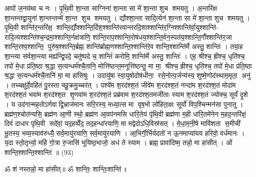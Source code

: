आपो॑ ज॒नय॑था च नः । पृ॒थि॒वी शा॒न्ता साग्निना॑ शा॒न्ता सा मे॑ शा॒न्ता शुच शमयतु । अ॒न्तरि॑क्ष शा॒न्तन्तद्वा॒युना॑ शा॒न्तन्तन्मे॑ शा॒न्त शुच शमयतु । द्यौश्शा॒न्ता सादि॒त्येन॑ शा॒न्ता सा मे॑ शा॒न्ता शुच शमयतु । पृ॒थि॒वी शान्ति॑र॒न्तरि॑क्ष॒ शान्ति॒र्द्यौश्शान्ति॒र्दिश॒श्शान्ति॑रवान्तरदि॒शाश्शान्ति॑र॒ग्निश्शान्ति॑र्वा॒युश्शान्ति॑- रादि॒त्यश्शान्ति॑श्च॒न्द्रमा॒श्शान्ति॒र्नक्ष॑त्राणि॒ शान्ति॒राप॒श्शान्ति॒रोष॑धय॒श्शान्ति॒र्वन॒स्पत॑य॒श्शान्ति॒र्गौश्शान्ति॑र॒जा शान्ति॒रश्व॒श्शान्ति॒ पुरु॑ष॒श्शान्ति॒र्ब्रह्म॒ शान्ति॑र्ब्राह्म॒णश्शान्ति॒श्शान्ति॑रे॒व शान्ति॒श्शान्ति॑र्मे अस्तु॒ शान्तिः॑ । तया॒ह शा॒न्त्या स॑र्वशा॒न्त्या मह्य॑न्द्वि॒पदे॒ चतु॑ष्पदे च॒ शान्तिं॑ करोमि॒ शान्ति॑र्मे अस्तु॒ शान्तिः॑ । एह॒ श्रीश्च॒ ह्रीश्च॒ धृति॑श्च॒ तपो॑ मे॒धा प्र॑ति॒ष्ठा श्र॒द्धा स॒त्यन्धर्म॑श्चै॒तानि॒ मोत्ति॑ष्ठन्त॒मनूत्ति॑ष्ठन्तु॒ मा मा॒ श्रीश्च॒ ह्रीश्च॒ धृति॑श्च॒ तपो॑ मे॒धा प्र॑ति॒ष्ठा श्र॒द्धा स॒त्यन्धर्म॑श्चै॒तानि॑ मा॒ मा हा॑सिषुः । उदायु॑षा स्वा॒युषोदोष॑धीना॒ रसे॒नोत्प॒र्जन्य॑स्य॒ शुष्मे॒णोद॑स्थाम॒मृता॒ अनु॑ । तच्चक्षु॑र्दे॒वहि॑तं पु॒रस्ताच्छु॒क्रमु॒च्चर॑त् । पश्ये॑म श॒रद॑श्श॒तं जीवे॑म श॒रद॑श्श॒तं नन्दा॑म श॒रद॑श्श॒तं मोदा॑म श॒रद॑श्श॒तं भवा॑म श॒रद॑श्श॒त शृ॒णवा॑म श॒रद॑श्श॒तं प्रब्र॑वाम श॒रद॑श्श॒तमजी॑ताः स्याम श॒रद॑श्श॒तं ज्योक्च॒ सूर्यं॑ दृ॒शे । य उद॑गान्मह॒तोऽर्णवाद्वि॒भ्राज॑मानः सरि॒रस्य॒ मध्या॒त्स मा वृष॒भो लो॑हिता॒क्षः सूर्यो॑ विप॒श्चिन्मन॑सा पुनातु । ब्रह्म॑ण॒श्चोत॑न्यसि॒ ब्रह्म॑ण आ॒णी स्थो॒ ब्रह्म॑ण आ॒वप॑नमसि धारि॒तेयं पृ॑थि॒वी ब्रह्म॑णा म॒ही धा॑रि॒तमे॑नेन म॒हद॒न्तरि॑क्षं॒ दिवं॑ दाधार पृथि॒वी सदे॑वां॒ यद॒हव्वेँद॒ तद॒हन्धा॑रयाणि॒ मा मद्वेदोऽधि॒विस्र॑सत् । मे॒धा॒म॒नी॒षे मावि॑शता स॒मीची॑ भू॒तस्य॒ भव्य॒स्याव॑रुध्यै॒ सर्व॒मायु॑रयाणि॒ सर्व॒मायु॑रयाणि । आ॒भिर्गी॒र्भिर्यदतो॑ न ऊ॒नमाप्या॑यय हरिवो॒ वर्ध॑मानः । य॒दा स्तो॒तृभ्यो॒ महि॑ गो॒त्रा रु॒जासि॑ भूयिष्ठ॒भाजो॒ अध॑ ते स्याम । ब्रह्म॒ प्रावा॑दिष्म॒ तन्नो॒ मा हा॑सीत् । ओं शान्ति॒श्शान्ति॒श्शान्तिः॑ ॥ (93)

\setcounter{anuvakam}{0}

ॐ शं नस्तन्नो॒ मा हा॑सीत्॥ ॐ शान्तिः॒ शान्तिः॒शान्ति॑॥

